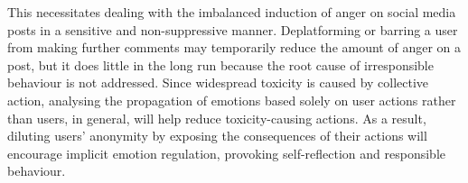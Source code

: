 \documentclass[acmtog]{acmart}
\begin{document}
This necessitates dealing with the imbalanced induction of anger on social media posts in a sensitive and non-suppressive manner. Deplatforming or barring a user from making further comments may temporarily reduce the amount of anger on a post, but it does little in the long run because the root cause of irresponsible behaviour is not addressed. Since widespread toxicity is caused by collective action, analysing the propagation of emotions based solely on user actions rather than users, in general, will help reduce toxicity-causing actions. As a result, diluting users' anonymity by exposing the consequences of their actions will encourage implicit emotion regulation, provoking self-reflection and responsible behaviour.



\end{document}
